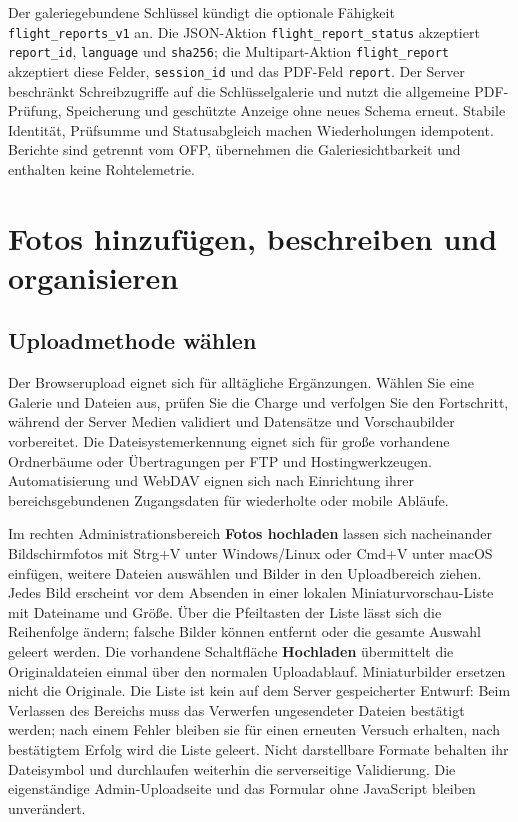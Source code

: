 \documentclass[11pt,a4paper]{article}
\newcommand{\ui}[1]{\textbf{#1}}
\begin{document}
Der galeriegebundene Schlüssel kündigt die optionale Fähigkeit
\texttt{flight\_reports\_v1} an. Die JSON-Aktion
\texttt{flight\_report\_status} akzeptiert \texttt{report\_id},
\texttt{language} und \texttt{sha256}; die Multipart-Aktion
\texttt{flight\_report} akzeptiert diese Felder, \texttt{session\_id} und
das PDF-Feld \texttt{report}. Der Server beschränkt Schreibzugriffe auf die
Schlüsselgalerie und nutzt die allgemeine PDF-Prüfung, Speicherung und
geschützte Anzeige ohne neues Schema erneut. Stabile Identität, Prüfsumme und
Statusabgleich machen Wiederholungen idempotent. Berichte sind getrennt vom OFP,
übernehmen die Galeriesichtbarkeit und enthalten keine Rohtelemetrie.

\section{Fotos hinzufügen, beschreiben und organisieren}
\label{sec:photo-workflow}

\subsection{Uploadmethode wählen}

Der Browserupload eignet sich für alltägliche Ergänzungen. Wählen Sie eine
Galerie und Dateien aus, prüfen Sie die Charge und verfolgen Sie den
Fortschritt, während der Server Medien validiert und Datensätze und
Vorschaubilder vorbereitet. Die Dateisystemerkennung eignet sich für große
vorhandene Ordnerbäume oder Übertragungen per FTP und Hostingwerkzeugen.
Automatisierung und WebDAV eignen sich nach Einrichtung ihrer bereichsgebundenen
Zugangsdaten für wiederholte oder mobile Abläufe.

Im rechten Administrationsbereich \ui{Fotos hochladen} lassen sich nacheinander
Bildschirmfotos mit Strg+V unter Windows/Linux oder Cmd+V unter macOS einfügen,
weitere Dateien auswählen und Bilder in den Uploadbereich ziehen. Jedes Bild
erscheint vor dem Absenden in einer lokalen Miniaturvorschau-Liste mit Dateiname
und Größe. Über die Pfeiltasten der Liste lässt sich die Reihenfolge ändern;
falsche Bilder können entfernt oder die gesamte Auswahl geleert werden. Die
vorhandene Schaltfläche \ui{Hochladen} übermittelt die Originaldateien einmal
über den normalen Uploadablauf. Miniaturbilder ersetzen nicht die Originale. Die
Liste ist kein auf dem Server gespeicherter Entwurf: Beim Verlassen des Bereichs
muss das Verwerfen ungesendeter Dateien bestätigt werden; nach einem Fehler
bleiben sie für einen erneuten Versuch erhalten, nach bestätigtem Erfolg wird
die Liste geleert. Nicht darstellbare Formate behalten ihr Dateisymbol und
durchlaufen weiterhin die serverseitige Validierung. Die eigenständige
Admin-Uploadseite und das Formular ohne JavaScript bleiben unverändert.
\end{document}

